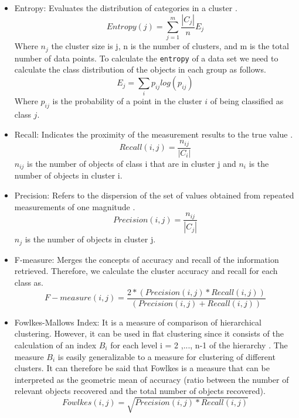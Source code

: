 \begin{itemize}
    \item Entropy: Evaluates the distribution of categories in a cluster \citep{b40}.
    \begin{equation}
        Entropy(j) =  \sum_{j=1}^{m} \frac{|C_{j}|}{n}E_{j}
    \end{equation}
    Where $n_{j}$ the cluster size is j, n is the number of clusters, and m is the total number of data points. To calculate the \texttt{entropy} of a data set we need to calculate the class distribution of the objects in each group as follows.
    \begin{equation}
        E_{j} =  \sum_{i} p_{ij}log(p_{ij})
    \end{equation}
    Where $p_{ij}$ is the probability of a point in the cluster $i$ of being classified as class $j$.
    \item Recall: Indicates the proximity of the measurement results to the true value \citep{b41}.
    \begin{equation}
         Recall(i,j) = \frac{n_{ij}}{|C_{i}|}
    \end{equation}
    $n_{ij}$ is the number of objects of class i that are in cluster j and $n_{i}$ is the number of objects in cluster i.
    \item Precision: Refers to the dispersion of the set of values obtained from repeated measurements of one magnitude \citep{b41}.
        \begin{equation}
            Precision(i,j) = \frac{n_{ij}}{|C_{j}|}
        \end{equation}
     $n_{j}$ is the number of objects in cluster j.
    \item F-measure: Merges the concepts of accuracy and recall of the information retrieved. Therefore, we calculate the cluster accuracy and recall for each class as.
    \begin{equation}
        F-measure(i,j) = \frac{2 * (Precision(i,j) * Recall(i,j))}{(Precision(i,j) + Recall(i,j))}
    \end{equation}
    \item Fowlkes-Mallows Index: It is a measure of comparison of hierarchical clustering. However, it can be used in flat clustering since it consists of the calculation of an index $B_{i}$ for each level i = 2 ,..., n-1 of the hierarchy \citep{b43}. The measure $B_{i}$ is easily generalizable to a measure for clustering of different clusters. It can therefore be said that Fowlkes is a measure that can be interpreted as the geometric mean of accuracy (ratio between the number of relevant objects recovered and the total number of objects recovered).
    \begin{equation}
        Fowlkes(i,j) = \sqrt{Precision(i,j) * Recall(i,j)}
    \end{equation}


\end{itemize}
